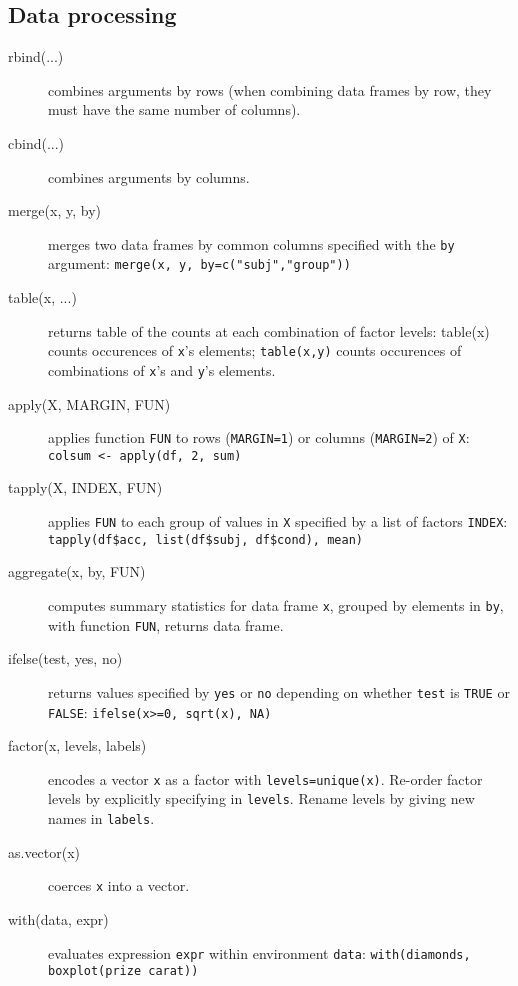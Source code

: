 \documentclass[a4paper,9pt]{extarticle}
\begin{document}
\begin{multicols}{3}
\section{Data processing}
\begin{description}
\item[rbind(...)] combines arguments by rows (when combining data frames by row, they must have the same number of columns).
\item[cbind(...)] combines arguments by columns.
\item[merge(x, y, by)] merges two data frames by common columns specified with the \texttt{by} argument: \texttt{merge(x, y, by=c("subj","group"))}
\item[table(x, ...)] returns table of the counts at each combination of factor levels: table(x) counts occurences of \texttt{x}'s elements; \texttt{table(x,y)} counts occurences of combinations of \texttt{x}'s and \texttt{y}'s elements.
\item[apply(X, MARGIN, FUN)] applies function \texttt{FUN} to rows (\texttt{MARGIN=1}) or columns (\texttt{MARGIN=2}) of \texttt{X}: \texttt{colsum <- apply(df, 2, sum)}
\item[tapply(X, INDEX, FUN)] applies \texttt{FUN} to each group of values in \texttt{X} specified by a list of factors \texttt{INDEX}: \texttt{tapply(df\$acc, list(df\$subj, df\$cond), mean)}
\item[aggregate(x, by, FUN)] computes summary statistics for data frame \texttt{x}, grouped by elements in \texttt{by}, with function \texttt{FUN}, returns data frame.
\item[ifelse(test, yes, no)] returns values specified by \texttt{yes} or \texttt{no} depending on whether \texttt{test} is \texttt{TRUE} or \texttt{FALSE}: \texttt{ifelse(x>=0, sqrt(x), NA)}
\item[factor(x, levels, labels)] encodes a vector \texttt{x} as a factor with \texttt{levels=unique(x)}. Re-order factor levels by explicitly specifying in \texttt{levels}. Rename levels by giving new names in \texttt{labels}.
\item[as.vector(x)] coerces \texttt{x} into a vector.
\item[with(data, expr)] evaluates expression \texttt{expr} within environment \texttt{data}: \texttt{with(diamonds, boxplot(prize~carat))}
\end{description}


\end{multicols}
\end{document}
